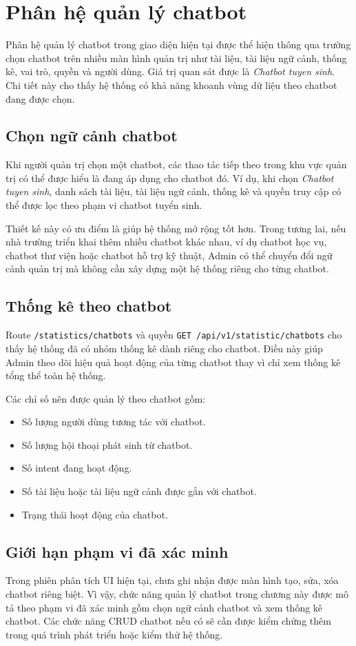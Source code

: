 \section{Phân hệ quản lý chatbot}

Phân hệ quản lý chatbot trong giao diện hiện tại được thể hiện thông qua trường chọn chatbot trên nhiều màn hình quản trị như tài liệu, tài liệu ngữ cảnh, thống kê, vai trò, quyền và người dùng. Giá trị quan sát được là \textit{Chatbot tuyen sinh}. Chi tiết này cho thấy hệ thống có khả năng khoanh vùng dữ liệu theo chatbot đang được chọn.

\subsection{Chọn ngữ cảnh chatbot}

Khi người quản trị chọn một chatbot, các thao tác tiếp theo trong khu vực quản trị có thể được hiểu là đang áp dụng cho chatbot đó. Ví dụ, khi chọn \textit{Chatbot tuyen sinh}, danh sách tài liệu, tài liệu ngữ cảnh, thống kê và quyền truy cập có thể được lọc theo phạm vi chatbot tuyển sinh.

Thiết kế này có ưu điểm là giúp hệ thống mở rộng tốt hơn. Trong tương lai, nếu nhà trường triển khai thêm nhiều chatbot khác nhau, ví dụ chatbot học vụ, chatbot thư viện hoặc chatbot hỗ trợ kỹ thuật, Admin có thể chuyển đổi ngữ cảnh quản trị mà không cần xây dựng một hệ thống riêng cho từng chatbot.

\subsection{Thống kê theo chatbot}

Route \texttt{/statistics/chatbots} và quyền \texttt{GET /api/v1/statistic/chatbots} cho thấy hệ thống đã có nhóm thống kê dành riêng cho chatbot. Điều này giúp Admin theo dõi hiệu quả hoạt động của từng chatbot thay vì chỉ xem thống kê tổng thể toàn hệ thống.

Các chỉ số nên được quản lý theo chatbot gồm:

\begin{itemize}
    \item Số lượng người dùng tương tác với chatbot.
    \item Số lượng hội thoại phát sinh từ chatbot.
    \item Số intent đang hoạt động.
    \item Số tài liệu hoặc tài liệu ngữ cảnh được gắn với chatbot.
    \item Trạng thái hoạt động của chatbot.
\end{itemize}

\subsection{Giới hạn phạm vi đã xác minh}

Trong phiên phân tích UI hiện tại, chưa ghi nhận được màn hình tạo, sửa, xóa chatbot riêng biệt. Vì vậy, chức năng quản lý chatbot trong chương này được mô tả theo phạm vi đã xác minh gồm chọn ngữ cảnh chatbot và xem thống kê chatbot. Các chức năng CRUD chatbot nếu có sẽ cần được kiểm chứng thêm trong quá trình phát triển hoặc kiểm thử hệ thống.
